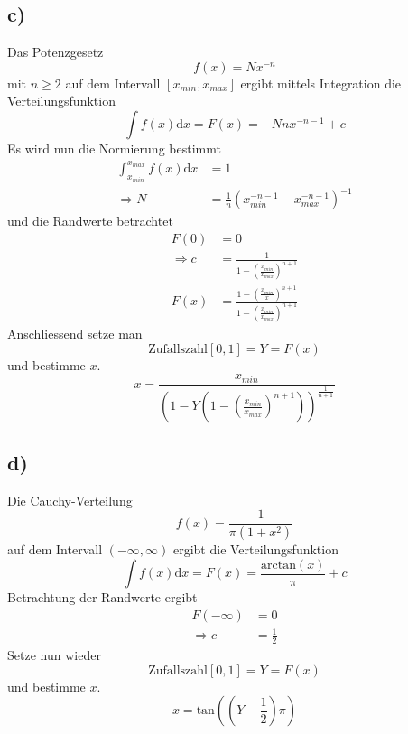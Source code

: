 \subsection{c)}
Das Potenzgesetz
\begin{equation}
  f(x)=Nx^{-n}
\end{equation}
mit $n\geq 2$ auf dem Intervall $[x_{min},x_{max}]$ ergibt mittels Integration die Verteilungsfunktion
\begin{equation}
  \int f(x)\text{d}x=F(x)=-Nnx^{-n-1}+c
\end{equation}
Es wird nun die Normierung bestimmt
\begin{align}
  \int_{x_{min}}^{x_{max}}f(x)\text{d}x&=1\\
  \Rightarrow N&=\frac{1}{n}\left(x_{min}^{-n-1}-x_{max}^{-n-1}\right)^{-1}
\end{align}
und die Randwerte betrachtet
\begin{align}
  F(0)&=0\\
  \Rightarrow c&=\frac{1}{1-\left(\frac{x_{min}}{x_{max}}\right)^{n+1}}  \\
  F(x)&=\frac{1- \left(\frac{x_{min}}{x}\right)^{n+1}}{1-\left(\frac{x_{min}}{x_{max}}\right)^{n+1}}
\end{align}
Anschliessend setze man
\begin{equation}
  \text{Zufallszahl}[0,1]=Y=F(x)
\end{equation}
und bestimme $x$.
\begin{equation}
  x=\frac{x_{min}}{\left(1-Y\left(1-\left(\frac{x_{min}}{x_{max}}\right)^{n+1}\right)\right)^{\frac{1}{n+1}}}
\end{equation}
\subsection{d)}
Die Cauchy-Verteilung
\begin{equation}
  f(x)=\frac{1}{\pi(1+x^2)}
\end{equation}
auf dem Intervall $(-\infty,\infty)$ ergibt die Verteilungsfunktion
\begin{equation}
  \int f(x)\text{d}x=F(x)=\frac{\text{arctan}(x)}{\pi}+c
\end{equation}
Betrachtung der Randwerte ergibt
\begin{align}
  F(-\infty)&=0\\
  \Rightarrow c&=\frac{1}{2}
\end{align}
Setze nun wieder
\begin{equation}
  \text{Zufallszahl}[0,1]=Y=F(x)
\end{equation}
und bestimme $x$.
\begin{equation}
  x=\text{tan}\left(\left(Y-\frac{1}{2}\right)\pi\right)
\end{equation}
